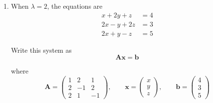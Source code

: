 \documentclass[leqno]{article}
\begin{document}
\begin{enumerate}[
  label=\textbf{\arabic*.},
  leftmargin=*,
  topsep=0pt,
  partopsep=0pt,
  parsep=0pt
]
\begin{djsSolution}
\begin{enumerate}[label=\textbf{(\alph*)}]
Expanding along the first row:
\begin{align*}
\det(\mathbf{A})
&=1\begin{vmatrix}-1&2\\1&-1\end{vmatrix}
-\lambda\begin{vmatrix}2&2\\2&-1\end{vmatrix}
+1\begin{vmatrix}2&-1\\2&1\end{vmatrix}\\
&=1\bigl((-1)(-1)-2(1)\bigr)
-\lambda\bigl(2(-1)-2(2)\bigr)
+\bigl(2(1)-(-1)(2)\bigr)\\
&=(1-2)-\lambda(-2-4)+(2+2)\\
&=-1+6\lambda+4\\
&=6\lambda+3\\
&=3(2\lambda+1)
\end{align*}

So the planes meet at a unique point whenever
\[
3(2\lambda+1)\neq 0
\]

that is
\[
\lambda\neq -\frac12
\]

Hence the exceptional value is
\[
\lambda=-\frac12
\]

For $\lambda=-\frac12$, the first plane is
\[
x-\frac12 y+z=4
\]

and multiplying by $2$ gives
\[
2x-y+2z=8
\]

but the second plane is
\[
2x-y+2z=3
\]

so the system is inconsistent. Therefore there is no common point in this case.

Hence the three planes meet at a unique point for all $\lambda$ except $\lambda=-\frac12$.

  \item When $\lambda=2$, the equations are
\[
\begin{aligned}
x+2y+z&=4\\
2x-y+2z&=3\\
2x+y-z&=5
\end{aligned}
\]

Write this system as
\[
\mathbf{A}\mathbf{x}=\mathbf{b}
\]

where
\[
\mathbf{A}=
\begin{pmatrix}
1&2&1\\
2&-1&2\\
2&1&-1
\end{pmatrix},
\qquad
\mathbf{x}=
\begin{pmatrix}
x\\
y\\
z
\end{pmatrix},
\qquad
\mathbf{b}=
\begin{pmatrix}
4\\
3\\
5
\end{pmatrix}
\]


\end{enumerate}
\end{djsSolution}
\end{enumerate}
\end{document}
